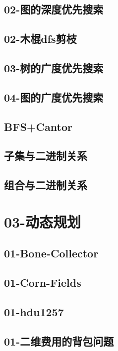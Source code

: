 \documentclass[10pt,a4paper]{article}
\begin{document}
\subsection{02-图的深度优先搜索}

\subsection{02-木棍dfs剪枝}

\subsection{03-树的广度优先搜索}

\subsection{04-图的广度优先搜索}

\subsection{BFS+Cantor}

\subsection{子集与二进制关系}

\subsection{组合与二进制关系}

\section{03-动态规划}
\subsection{01-Bone-Collector}

\subsection{01-Corn-Fields}

\subsection{01-hdu1257}

\subsection{01-二维费用的背包问题}

\end{document}
